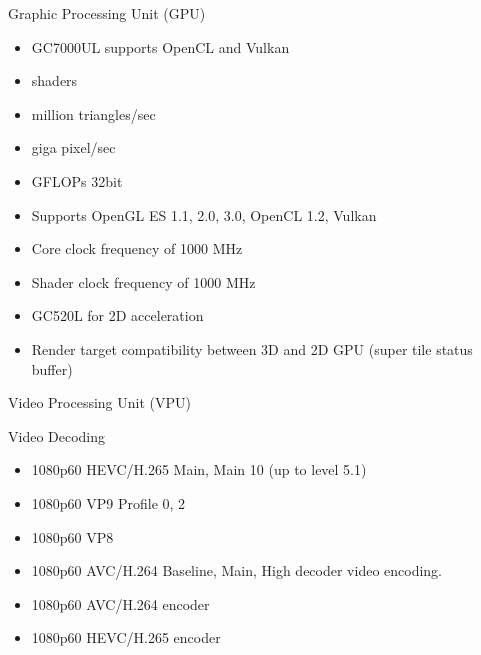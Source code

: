 \documentclass[letterpaper,10pt,openany,english]{sphinxmanual}
\begin{document}
\sphinxAtStartPar
Graphic Processing Unit (GPU)
\begin{itemize}
\item {} 
\sphinxAtStartPar
GC7000UL supports OpenCL and Vulkan

\item {} 
 shaders

\item {} 
 million triangles/sec

\item {} 
 giga pixel/sec

\item {} 
 GFLOPs 32\sphinxhyphen{}bit

\item {} 
\sphinxAtStartPar
Supports OpenGL ES 1.1, 2.0, 3.0, OpenCL 1.2, Vulkan

\item {} 
\sphinxAtStartPar
Core clock frequency of 1000 MHz

\item {} 
\sphinxAtStartPar
Shader clock frequency of 1000 MHz

\item {} 
\sphinxAtStartPar
GC520L for 2D acceleration

\item {} 
\sphinxAtStartPar
Render target compatibility between 3D and 2D GPU (super tile status buffer)

\end{itemize}

\sphinxAtStartPar
Video Processing Unit (VPU)

\sphinxAtStartPar
Video Decoding
\begin{itemize}
\item {} 
\sphinxAtStartPar
1080p60 HEVC/H.265 Main, Main 10 (up to level 5.1)

\item {} 
\sphinxAtStartPar
1080p60 VP9 Profile 0, 2

\item {} 
\sphinxAtStartPar
1080p60 VP8

\item {} 
\sphinxAtStartPar
1080p60 AVC/H.264 Baseline, Main, High decoder  video encoding.

\item {} 
\sphinxAtStartPar
1080p60 AVC/H.264 encoder

\item {} 
\sphinxAtStartPar
1080p60 HEVC/H.265 encoder

\end{itemize}
\end{document}
